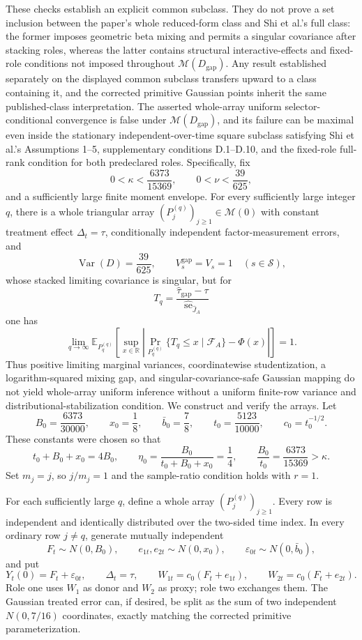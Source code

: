 These checks establish an explicit common subclass.  They do not prove a set inclusion between the paper's whole reduced-form class and Shi et al.'s full class: the former imposes geometric beta mixing and permits a singular covariance after stacking roles, whereas the latter contains structural interactive-effects and fixed-role conditions not imposed throughout \(\mathcal M(D_{\mathrm{gap}})\).  Any result established separately on the displayed common subclass transfers upward to a class containing it, and the corrected primitive Gaussian points inherit the same published-class interpretation.
The asserted whole-array uniform selector-conditional convergence is false under \(\mathcal M(D_{\mathrm{gap}})\), and its failure can be maximal even inside the stationary independent-over-time square subclass satisfying Shi et al.'s Assumptions 1--5, supplementary conditions D.1--D.10, and the fixed-role full-rank condition for both predeclared roles.  Specifically, fix
\[
 0<\kappa<\frac{6373}{15369},\qquad
 0<\nu<\frac{39}{625},
\]
and a sufficiently large finite moment envelope.  For every sufficiently large integer \(q\), there is a whole triangular array \((P_j^{(q)})_{j\geq1}\in\mathcal M(0)\) with constant treatment effect \(\Delta_t=\tau\), conditionally independent factor-measurement errors, and
\[
 \operatorname{Var}(D)=\frac{39}{625},\qquad
 V_s^{\mathrm{gap}}=V_s=1\quad(s\in\mathcal S),
\]
whose stacked limiting covariance is singular, but for
\[
 T_q=
 \frac{\widehat\tau_{\mathrm{gap}}-\tau}
      {\widehat{\operatorname{se}}_{\widehat J_A}}
\]
one has
\[
 \lim_{q\to\infty}
 \mathbb E_{P_q^{(q)}}\!\left[
  \sup_{x\in\mathbb R}
  \left|
   \Pr_{P_q^{(q)}}\{T_q\leq x\mid\mathcal F_A\}-\Phi(x)
  \right|
 \right]=1.
\]
Thus positive limiting marginal variances, coordinatewise studentization, a logarithm-squared mixing gap, and singular-covariance-safe Gaussian mapping do not yield whole-array uniform inference without a uniform finite-row variance and distributional-stabilization condition.
We construct and verify the arrays.  Let
\[
 B_0=\frac{6373}{30000},\qquad
 x_0=\frac18,\qquad
 \bar b_0=\frac78,\qquad
 t_0=\frac{5123}{10000},\qquad
 c_0=t_0^{-1/2}.
\]
These constants were chosen so that
\[
 t_0+B_0+x_0=4B_0,\qquad
 \eta_0=\frac{B_0}{t_0+B_0+x_0}=\frac14,
\qquad
 \frac{B_0}{t_0}=\frac{6373}{15369}>\kappa.
\]
Set \(m_j=j\), so \(j/m_j=1\) and the sample-ratio condition holds with \(r=1\).

For each sufficiently large \(q\), define a whole array \((P_j^{(q)})_{j\geq1}\).  Every row is independent and identically distributed over the two-sided time index.  In every ordinary row \(j\neq q\), generate mutually independent
\[
 F_t\sim N(0,B_0),\qquad
 e_{1t},e_{2t}\sim N(0,x_0),\qquad
 \varepsilon_{0t}\sim N(0,\bar b_0),
\]
and put
\[
 Y_t(0)=F_t+\varepsilon_{0t},\qquad
 \Delta_t=\tau,\qquad
 W_{1t}=c_0(F_t+e_{1t}),\qquad
 W_{2t}=c_0(F_t+e_{2t}).
\]
Role one uses \(W_1\) as donor and \(W_2\) as proxy; role two exchanges them.  The Gaussian treated error can, if desired, be split as the sum of two independent \(N(0,7/16)\) coordinates, exactly matching the corrected primitive parameterization.

